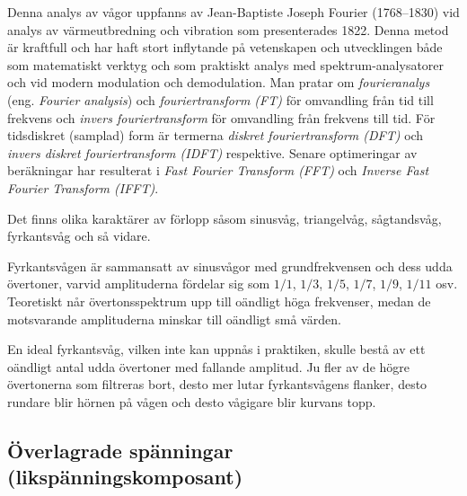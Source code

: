 
Denna analys av vågor uppfanns av Jean-Baptiste Joseph Fourier (1768--1830)
vid analys av värmeutbredning och vibration som presenterades 1822.
Denna metod är kraftfull och har haft stort inflytande på vetenskapen och
utvecklingen både som matematiskt verktyg och som praktiskt analys med
spektrum-analysatorer och vid modern modulation och demodulation.
Man pratar om \emph{fourieranalys} (eng. \emph{Fourier analysis}) och
\emph{fouriertransform (FT)} för omvandling från tid till frekvens och
\emph{invers fouriertransform} för omvandling från frekvens till tid.
För tidsdiskret (samplad) form är termerna
\emph{diskret fouriertransform (DFT)} och
\emph{invers diskret fouriertransform (IDFT)} respektive.
Senare optimeringar av beräkningar har resulterat i
\emph{Fast Fourier Transform (FFT)} och
\emph{Inverse Fast Fourier Transform (IFFT)}.

Det finns olika karaktärer av förlopp såsom sinusvåg, triangelvåg, sågtandsvåg,
fyrkantsvåg och så vidare.

Fyrkantsvågen är sammansatt av sinusvågor med grundfrekvensen och dess udda
övertoner, varvid amplituderna fördelar sig som \(1/1\), \(1/3\), \(1/5\),
\(1/7\), \(1/9\), \(1/11\) osv.
Teoretiskt når övertonsspektrum upp till oändligt höga frekvenser, medan de
motsvarande amplituderna minskar till oändligt små värden.

En ideal fyrkantsvåg, vilken inte kan uppnås i praktiken, skulle bestå av ett
oändligt antal udda övertoner med fallande amplitud.
Ju fler av de högre övertonerna som filtreras bort, desto mer lutar
fyrkantsvågens flanker, desto rundare blir hörnen på vågen och desto vågigare
blir kurvans topp.

\subsection{Överlagrade spänningar (likspänningskomposant)}

